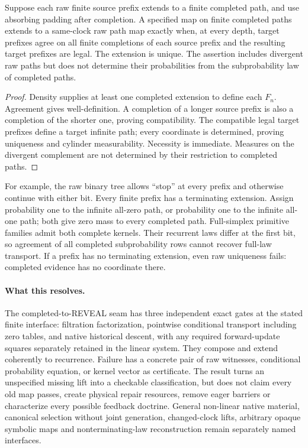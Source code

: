 \documentclass{article}
\begin{document}
\begin{proposition}
Suppose each raw finite source prefix extends to a finite completed path, and use absorbing padding after completion. A specified map on finite completed paths extends to a same-clock raw path map exactly when, at every depth, target prefixes agree on all finite completions of each source prefix and the resulting target prefixes are legal. The extension is unique. The assertion includes divergent raw paths but does not determine their probabilities from the subprobability law of completed paths.
\end{proposition}
\begin{proof}
Density supplies at least one completed extension to define each $F_n$. Agreement gives well-definition. A completion of a longer source prefix is also a completion of the shorter one, proving compatibility. The compatible legal target prefixes define a target infinite path; every coordinate is determined, proving uniqueness and cylinder measurability. Necessity is immediate. Measures on the divergent complement are not determined by their restriction to completed paths.\end{proof}
For example, the raw binary tree allows ``stop'' at every prefix and otherwise continue with either bit. Every finite prefix has a terminating extension. Assign probability one to the infinite all-zero path, or probability one to the infinite all-one path; both give zero mass to every completed path. Full-simplex primitive families admit both complete kernels. Their recurrent laws differ at the first bit, so agreement of all completed subprobability rows cannot recover full-law transport. If a prefix has no terminating extension, even raw uniqueness fails: completed evidence has no coordinate there.

\paragraph{What this resolves.}
The completed-to-REVEAL seam has three independent exact gates at the stated finite interface: filtration factorization, pointwise conditional transport including zero tables, and native historical descent, with any required forward-update squares separately retained in the linear system. They compose and extend coherently to recurrence. Failure has a concrete pair of raw witnesses, conditional probability equation, or kernel vector as certificate. The result turns an unspecified missing lift into a checkable classification, but does not claim every old map passes, create physical repair resources, remove eager barriers or characterize every possible feedback doctrine. General non-linear native material, canonical selection without joint generation, changed-clock lifts, arbitrary opaque symbolic maps and nonterminating-law reconstruction remain separately named interfaces.
\end{document}
